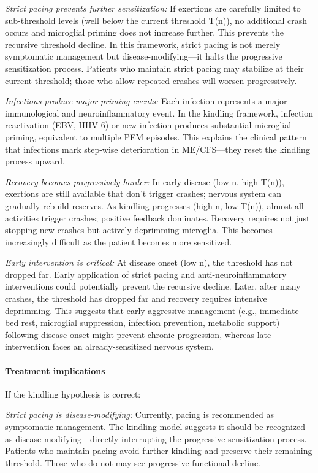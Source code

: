 \begin{hypothesis}
\textit{Strict pacing prevents further sensitization:} If exertions are carefully limited to sub-threshold levels (well below the current threshold T(n)), no additional crash occurs and microglial priming does not increase further. This prevents the recursive threshold decline. In this framework, strict pacing is not merely symptomatic management but disease-modifying---it halts the progressive sensitization process. Patients who maintain strict pacing may stabilize at their current threshold; those who allow repeated crashes will worsen progressively.

\textit{Infections produce major priming events:} Each infection represents a major immunological and neuroinflammatory event. In the kindling framework, infection reactivation (EBV, HHV-6) or new infection produces substantial microglial priming, equivalent to multiple PEM episodes. This explains the clinical pattern that infections mark step-wise deterioration in ME/CFS---they reset the kindling process upward.

\textit{Recovery becomes progressively harder:} In early disease (low n, high T(n)), exertions are still available that don't trigger crashes; nervous system can gradually rebuild reserves. As kindling progresses (high n, low T(n)), almost all activities trigger crashes; positive feedback dominates. Recovery requires not just stopping new crashes but actively deprimming microglia. This becomes increasingly difficult as the patient becomes more sensitized.

\textit{Early intervention is critical:} At disease onset (low n), the threshold has not dropped far. Early application of strict pacing and anti-neuroinflammatory interventions could potentially prevent the recursive decline. Later, after many crashes, the threshold has dropped far and recovery requires intensive deprimming. This suggests that early aggressive management (e.g., immediate bed rest, microglial suppression, infection prevention, metabolic support) following disease onset might prevent chronic progression, whereas late intervention faces an already-sensitized nervous system.

\paragraph{Treatment implications}

If the kindling hypothesis is correct:

\textit{Strict pacing is disease-modifying:} Currently, pacing is recommended as symptomatic management. The kindling model suggests it should be recognized as disease-modifying---directly interrupting the progressive sensitization process. Patients who maintain pacing avoid further kindling and preserve their remaining threshold. Those who do not may see progressive functional decline.


\end{hypothesis}
